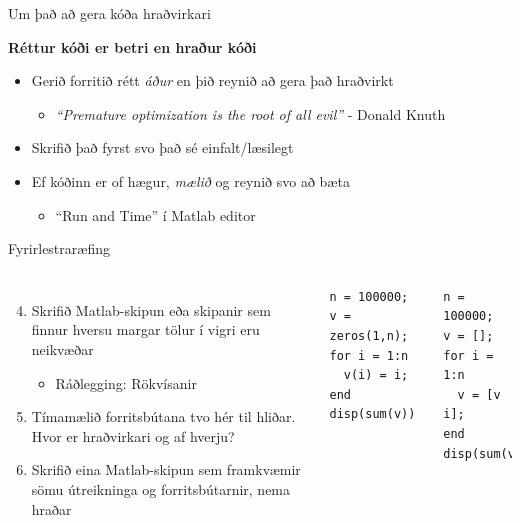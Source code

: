 \documentclass{beamer}
\begin{document}
\begin{frame}{Um það að gera kóða hraðvirkari}
\begin{center}
\large \textbf{Réttur kóði er betri en hraður kóði}
\end{center}
\begin{itemize}
 \item Gerið forritið rétt \emph{áður} en þið reynið að gera það hraðvirkt
 \begin{itemize}
  \item \emph{``Premature optimization is the root of all evil''} - Donald Knuth
 \end{itemize}
 \item Skrifið það fyrst svo það sé einfalt/læsilegt
 \item Ef kóðinn er of hægur, \emph{mælið} og reynið svo að bæta
 \begin{itemize}
  \item ``Run and Time'' í Matlab editor
 \end{itemize}
\end{itemize}
\end{frame}

\begin{frame}[fragile]{Fyrirlestraræfing}
\vspace{\baselineskip}
\begin{columns}
\begin{enumerate}
\setcounter{enumi}{3}
 \item Skrifið Matlab-skipun eða skipanir sem finnur hversu margar tölur í vigri eru neikvæðar
 \begin{itemize}
  \item Ráðlegging: Rökvísanir
 \end{itemize}
 \item Tímamælið forritsbútana tvo hér til hliðar. Hvor er hraðvirkari og af hverju?
 \item Skrifið eina Matlab-skipun sem framkvæmir sömu útreikninga og forritsbútarnir, nema hraðar
\end{enumerate}

\begin{verbatim}
n = 100000; v = zeros(1,n);
for i = 1:n
  v(i) = i;
end
disp(sum(v))
\end{verbatim}
\begin{verbatim}
n = 100000;  v = [];
for i = 1:n
  v = [v i];
end
disp(sum(v))
\end{verbatim}

\end{columns}

\end{frame}
\end{document}
